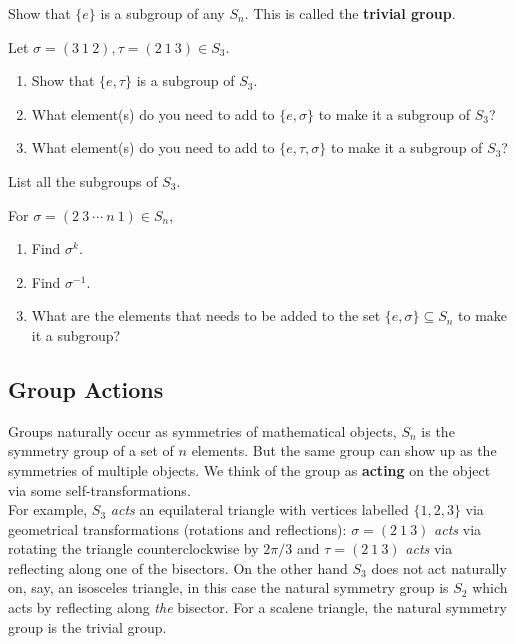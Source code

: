 \begin{questions}[resume]
  \item Show that $\{e\}$ is a subgroup of any $ S_n$. This is called the \textbf{trivial group}.
  \item  Let $ \sigma = (3 \: 1 \: 2), \tau = (2 \: 1 \: 3) \in S_3$.
  \begin{enumerate}
    \item Show that $\{e, \tau\}$ is a subgroup of $ S_3$.
    \item What element(s) do you need to add to $ \{ e, \sigma\}$ to make it a subgroup  of $ S_3$?
    \item What element(s) do you need to add to $ \{ e, \tau, \sigma\}$ to make it a subgroup of $ S_3$?
  \end{enumerate}
  \item List all the subgroups of $ S_3$.

  \item For $ \sigma = (2 \: 3 \: \cdots \: n \: 1) \in S_n$,
  \begin{enumerate}
    \item Find $ \sigma^k$.
    \item Find $ \sigma^{-1}$.
    \item What are the elements that needs to be added to the set $ \{ e , \sigma \} \subseteq S_n$ to make it a subgroup?
  \end{enumerate}  
\end{questions}





\newpage
\subsection{Group Actions}
Groups naturally occur as symmetries of mathematical objects, $ S_n$ is the symmetry group of a set of $ n$ elements. But the same group can show up as the symmetries of multiple objects. We think of the group as \textbf{acting} on the object via some self-transformations. \\

For example, $ S_3$ \emph{acts} an equilateral triangle with vertices labelled $ \{ 1,2,3 \}$ via geometrical transformations (rotations and reflections): $ \sigma = (2 \: 1 \: 3)$ \emph{acts} via rotating the triangle counterclockwise by $ 2\pi/3$ and $ \tau = (2 \: 1 \: 3)$ \emph{acts} via reflecting along one of the bisectors. On the other hand $ S_3$ does not act naturally on, say, an isosceles triangle, in this case the natural symmetry group is $ S_2$ which acts by reflecting along \emph{the} bisector. For a scalene triangle, the natural symmetry group is the trivial group.

